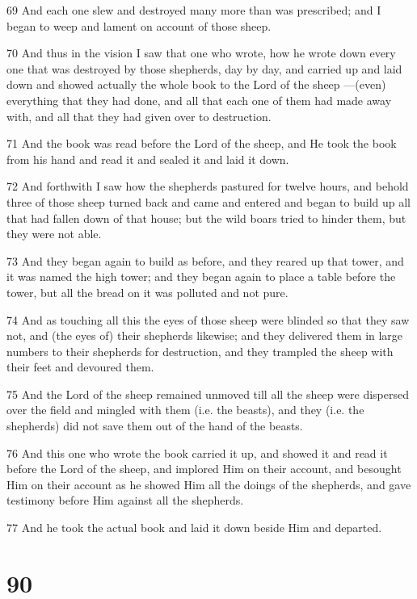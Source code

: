 \par 69 And each one slew and destroyed many more than was prescribed; and I began to weep and lament on account of those sheep.
\par 70 And thus in the vision I saw that one who wrote, how he wrote down every one that was destroyed by those shepherds, day by day, and carried up and laid down and showed actually the whole book to the Lord of the sheep —(even) everything that they had done, and all that each one of them had made away with, and all that they had given over to destruction.
\par 71 And the book was read before the Lord of the sheep, and He took the book from his hand and read it and sealed it and laid it down.
\par 72 And forthwith I saw how the shepherds pastured for twelve hours, and behold three of those sheep turned back and came and entered and began to build up all that had fallen down of that house; but the wild boars tried to hinder them, but they were not able.
\par 73 And they began again to build as before, and they reared up that tower, and it was named the high tower; and they began again to place a table before the tower, but all the bread on it was polluted and not pure.
\par 74 And as touching all this the eyes of those sheep were blinded so that they saw not, and (the eyes of) their shepherds likewise; and they delivered them in large numbers to their shepherds for destruction, and they trampled the sheep with their feet and devoured them.
\par 75 And the Lord of the sheep remained unmoved till all the sheep were dispersed over the field and mingled with them (i.e. the beasts), and they (i.e. the shepherds) did not save them out of the hand of the beasts.
\par 76 And this one who wrote the book carried it up, and showed it and read it before the Lord of the sheep, and implored Him on their account, and besought Him on their account as he showed Him all the doings of the shepherds, and gave testimony before Him against all the shepherds.
\par 77 And he took the actual book and laid it down beside Him and departed.

\chapter{90}


